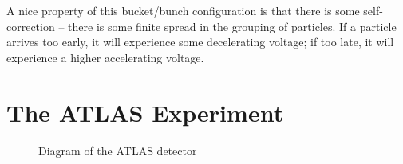 A nice property of this bucket/bunch configuration is that there is some self-correction -- there is 
some finite spread in the grouping of particles. If a particle arrives too early, it will experience some 
decelerating voltage; if too late, it will experience a higher accelerating voltage.


\section{The ATLAS Experiment}

\newcommand{\AtlasCoordFootnote}{%
ATLAS uses a right-handed coordinate system with its origin at the nominal interaction point (IP)
in the centre of the detector and the \(z\)-axis along the beam pipe.
The \(x\)-axis points from the IP to the centre of the LHC ring,
and the \(y\)-axis points upwards.
Cylindrical coordinates \((r,\phi)\) are used in the transverse plane, 
\(\phi\) being the azimuthal angle around the \(z\)-axis.
The pseudorapidity is defined in terms of the polar angle \(\theta\) as \(\eta = -\ln \tan(\theta/2)\).
Angular distance is measured in units of \(\Delta R \equiv \sqrt{(\Delta\eta)^{2} + (\Delta\phi)^{2}}\).}


\begin{figure}[ht]
\centering
{}
\caption{Diagram of the ATLAS detector \cite{DetectorImage}}
\end{figure}

